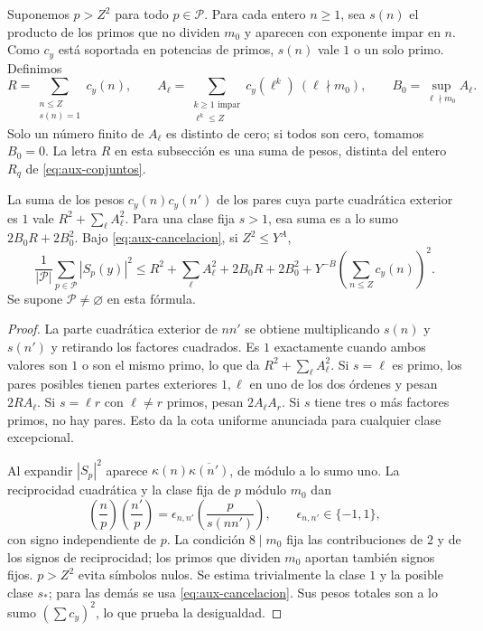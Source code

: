 Suponemos $p>Z^2$ para todo $p\in\mathcal P$.
Para cada entero $n\ge1$, sea $s(n)$ el producto de los primos que no dividen
$m_0$ y aparecen con exponente impar en $n$.
Como $c_y$ está soportada en potencias de primos, $s(n)$ vale $1$
o un solo primo. Definimos
\begin{equation}
 R=\sum_{\substack{n\le Z\\s(n)=1}}c_y(n),\qquad
 A_\ell=\sum_{\substack{k\ge1\text{ impar}\\\ell^k\le Z}}
                         c_y(\ell^k)\ (\ell\nmid m_0),\qquad
 B_0=\sup_{\ell\nmid m_0}A_\ell.
 \label{eq:aux-coeficientes}
\end{equation}
Solo un número finito de $A_\ell$ es distinto de cero; si todos son cero,
tomamos $B_0=0$. La letra $R$ en esta subsección es una suma de pesos,
distinta del entero $R_q$ de \eqref{eq:aux-conjuntos}.

\begin{lema}
\label{lem:aux-clases}
La suma de los pesos $c_y(n)c_y(n')$ de los pares cuya parte cuadrática
exterior es $1$ vale $R^2+\sum_\ell A_\ell^2$.
Para una clase fija $s>1$, esa suma es a lo sumo
$2B_0R+2B_0^2$. Bajo \eqref{eq:aux-cancelacion}, si $Z^2\le Y^A$,
\begin{equation}
 \frac1{|\mathcal P|}\sum_{p\in\mathcal P}|S_p(y)|^2
 \le R^2+\sum_\ell A_\ell^2+2B_0R+2B_0^2
       +Y^{-B}\left(\sum_{n\le Z}c_y(n)\right)^2.
 \label{eq:aux-momento-finito}
\end{equation}
Se supone $\mathcal P\ne\varnothing$ en esta fórmula.
\end{lema}

\begin{proof}
La parte cuadrática exterior de $nn'$ se obtiene multiplicando
$s(n)$ y $s(n')$ y retirando los factores cuadrados. Es $1$ exactamente
cuando ambos valores son $1$ o son el mismo primo, lo que da
$R^2+\sum_\ell A_\ell^2$.
Si $s=\ell$ es primo, los pares posibles tienen partes exteriores
$1,\ell$ en uno de los dos órdenes y pesan $2RA_\ell$.
Si $s=\ell r$ con $\ell\ne r$ primos, pesan $2A_\ell A_r$.
Si $s$ tiene tres o más factores primos, no hay pares. Esto da la
cota uniforme anunciada para cualquier clase excepcional.

Al expandir $|S_p|^2$ aparece
$\kappa(n)\overline{\kappa(n')}$, de módulo a lo sumo uno.
La reciprocidad cuadrática y la clase fija de $p$ módulo $m_0$ dan
\[
 \left(\frac n p\right)\left(\frac{n'}p\right)
 =\epsilon_{n,n'}\left(\frac p{s(nn')}\right),
 \qquad \epsilon_{n,n'}\in\{-1,1\},
\]
con signo independiente de $p$. La condición $8\mid m_0$ fija
las contribuciones de $2$ y de los signos de reciprocidad; los primos
que dividen $m_0$ aportan también signos fijos. $p>Z^2$ evita símbolos
nulos. Se estima trivialmente la clase $1$ y la posible clase $s_*$;
para las demás se usa \eqref{eq:aux-cancelacion}. Sus pesos totales
son a lo sumo $(\sum c_y)^2$, lo que prueba la desigualdad.
\end{proof}

